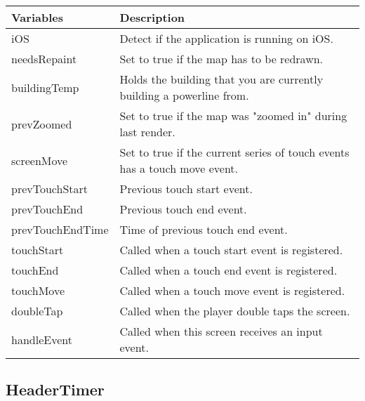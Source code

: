 	\begin{table}[H]
	\begin{tabular}{p{4cm} | p{8cm} }
	\hline
	\rowcolor{gray}
	Variables & Description \\ \hline



	iOS & Detect if the application is running on iOS. \\ \hline

	needsRepaint & Set to true if the map has to be redrawn. \\ \hline

	buildingTemp & Holds the building that you are currently building a powerline from. \\ \hline

	prevZoomed & Set to true if the map was "zoomed in" during last render. \\ \hline

  	screenMove & Set to true if the current series of touch events has a touch move event. \\ \hline

  	prevTouchStart & Previous touch start event. \\ \hline

 	prevTouchEnd & Previous touch end event. \\ \hline

  	prevTouchEndTime & Time of previous touch end event. \\ \hline

  	touchStart & Called when a touch start event is registered. \\ \hline

  	touchEnd & Called when a touch end event is registered. \\ \hline

  	touchMove & Called when a touch move event is registered. \\ \hline

  	doubleTap & Called when the player double taps the screen. \\ \hline

  	handleEvent & Called when this screen receives an input event. \\ \hline




	\end{tabular}
	\end{table}

\subsection*{HeaderTimer}

